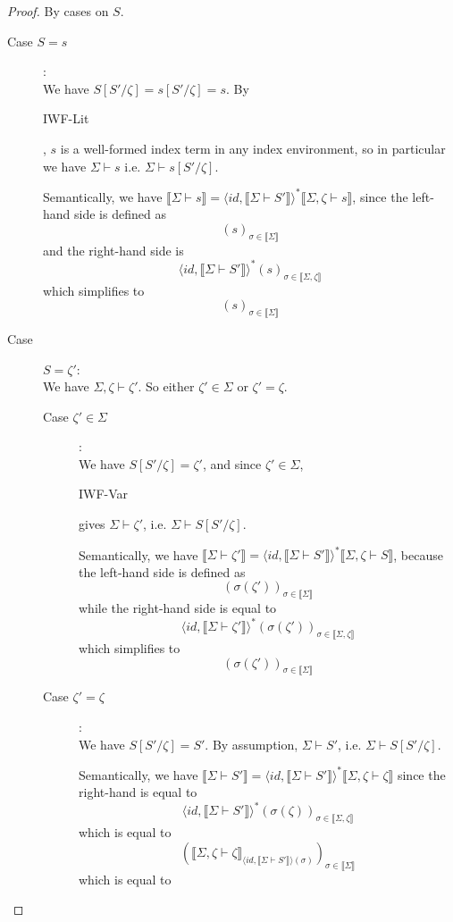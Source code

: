 \documentclass{article}
\newcommand{\sem}[1]{\llbracket #1 \rrbracket}
\newcommand{\sdisp}[1]{
\left( #1 \right)
}
\begin{document}
\begin{proof}
By cases on $S$.

\begin{description}
\item[Case $S = s$]:\\
We have $S[S'/\zeta] = s[S'/\zeta] = s$. By \begin{sc}IWF-Lit\end{sc}, $s$ is a well-formed index term in any index environment, so in particular we have $\Sigma \vdash s$ i.e. $\Sigma \vdash s[S'/\zeta]$.

Semantically, we have $\sem{\Sigma \vdash s} = \langle \mathit{id}, \sem{\Sigma \vdash S'} \rangle^* \sem{\Sigma,\zeta \vdash s}$, since the left-hand side is defined as $$( s )_{\sigma \in \sem{\Sigma}}$$ and the right-hand side is $$\langle \mathit{id}, \sem{\Sigma \vdash S'} \rangle^* ( s )_{\sigma \in \sem{\Sigma,\zeta}}$$ which simplifies to $$ ( s )_{\sigma \in \sem{\Sigma}}$$

\item[Case ]$S = \zeta'$:\\
We have $\Sigma,\zeta \vdash \zeta'$. So either $\zeta' \in \Sigma$ or $\zeta' = \zeta$.

\begin{description}
\item[Case $\zeta' \in \Sigma$]:\\
We have $S[S'/\zeta] = \zeta'$, and since $\zeta' \in \Sigma$, \begin{sc}IWF-Var\end{sc} gives $\Sigma \vdash \zeta'$, i.e. $\Sigma \vdash S[S'/\zeta]$.

Semantically, we have $\sem{\Sigma \vdash \zeta'} = \langle \mathit{id}, \sem{\Sigma \vdash S'} \rangle^* \sem{\Sigma,\zeta \vdash S}$, because the left-hand side is defined as $$\sdisp{\sigma(\zeta')}_{\sigma \in \sem{\Sigma}}$$ while the right-hand side is equal to $$\langle \mathit{id}, \sem{\Sigma \vdash \zeta'} \rangle^* (\sigma(\zeta'))_{\sigma \in \sem{\Sigma,\zeta}}$$ which simplifies to $$(\sigma(\zeta'))_{\sigma \in \sem{\Sigma}}$$
 
\item[Case $\zeta' = \zeta$]:\\
We have $S[S'/\zeta] = S'$. By assumption, $\Sigma \vdash S'$, i.e. $\Sigma \vdash S[S'/\zeta]$.

Semantically, we have $\sem{\Sigma \vdash S'} = \langle \mathit{id}, \sem{\Sigma \vdash S'} \rangle^* \sem{\Sigma,\zeta \vdash \zeta}$ since the right-hand is equal to $$\langle \mathit{id}, \sem{\Sigma \vdash S'} \rangle^* (\sigma(\zeta))_{\sigma \in \sem{\Sigma,\zeta}}$$
which is equal to
$$( \sem{\Sigma,\zeta \vdash \zeta}_{\langle \mathit{id}, \sem{\Sigma \vdash S'} \rangle(\sigma)} )_{\sigma \in \sem{\Sigma}}$$
which is equal to
$$ $$
\end{description}

\end{description}

\end{proof}
\end{document}
